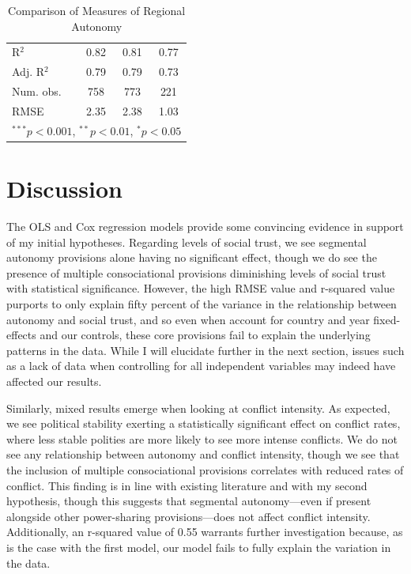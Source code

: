 \documentclass[12pt]{article}
\begin{document}
\begin{table}[!htbp]
\begin{center}
\begin{tabular}{l c c c }
			R$^2$                                & 0.82          & 0.81     & 0.77     \\
			Adj. R$^2$                           & 0.79          & 0.79     & 0.73     \\
			Num. obs.                            & 758           & 773      & 221      \\
			RMSE                                 & 2.35          & 2.38     & 1.03     \\
			\hline
			\multicolumn{4}{l}{\scriptsize{$^{***}p<0.001$, $^{**}p<0.01$, $^*p<0.05$}}
		\end{tabular}
		\caption{Comparison of Measures of Regional Autonomy}
		\label{table:coefficients}
	\end{center}
\end{table}

\section{Discussion}
The OLS and Cox regression models provide some convincing evidence in support of my initial hypotheses. Regarding levels of social trust, we see segmental autonomy provisions alone having no significant effect, though we do see the presence of multiple consociational provisions diminishing levels of social trust with statistical significance. However, the high RMSE value and r-squared value purports to only explain fifty percent of the variance in the relationship between autonomy and social trust, and so even when account for country and year fixed-effects and our controls, these core provisions fail to explain the underlying patterns in the data. While I will elucidate further in the next section, issues such as a lack of data when controlling for all independent variables may indeed have affected our results. 

Similarly, mixed results emerge when looking at conflict intensity. As expected, we see political stability exerting a statistically significant effect on conflict rates, where less stable polities are more likely to see more intense conflicts. We do not see any relationship between autonomy and conflict intensity, though we see that the inclusion of multiple consociational provisions correlates with reduced rates of conflict. This finding is in line with existing literature and with my second hypothesis, though this suggests that segmental autonomy—even if present alongside other power-sharing provisions—does not affect conflict intensity. Additionally, an r-squared value of 0.55 warrants further investigation because, as is the case with the first model, our model fails to fully explain the variation in the data. 
\end{document}
